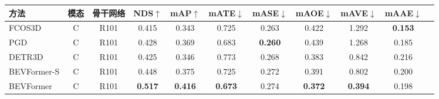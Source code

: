 \begin{tabular}{l  c c |c c| c c c c c c  }
\toprule
方法 &  模态 & 骨干网络 & NDS$\uparrow$  & mAP$\uparrow$  & mATE$\downarrow$     & mASE$\downarrow$     & mAOE$\downarrow$     & mAVE$\downarrow$    & mAAE$\downarrow$    \\
\midrule


FCOS3D~\cite{wang2021fcos3d}&  C & R101& 0.415 & 0.343 & 0.725 & 0.263 & 0.422 & 1.292  &\textbf{0.153}  \\
PGD~\cite{wang2022probabilistic} & C &R101 & 0.428 &0.369 &0.683 &\textbf{0.260}& 0.439 &1.268 &0.185 \\
DETR3D~\cite{wang2022detr3d}& C& R101 & 0.425 &0.346 &0.773 &0.268 &0.383 &0.842 &0.216\\


\rowcolor{gray95}
BEVFormer-S & C & R101& 0.448 & 0.375 & 0.725 & 0.272 & 0.391 & 0.802 & 0.200\\
\rowcolor{gray9}
BEVFormer   & C & R101& \textbf{0.517}& \textbf{0.416} & \textbf{0.673} & 0.274 & \textbf{0.372} & \textbf{0.394} & 0.198 \\
\bottomrule
\end{tabular}